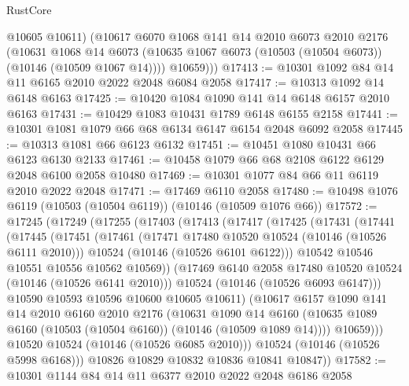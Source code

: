 \begin{lexlean}{RustCore}
\begin{coremodule}
          @10605
          @10611)
        (@10617
          @6070
          @1068
          @141
          @14
          @2010
          @6073
          @2010
          @2176
          (@10631
            @1068
            @14
            @6073
            (@10635 @1067 @6073 (@10503 (@10504 @6073)) (@10146 (@10509 @1067 @14))))
          @10659)))
@17413 := @10301 @1092 @84 @14 @11 @6165 @2010 @2022 @2048 @6084 @2058
@17417 := @10313 @1092 @14 @6148 @6163
@17425 := @10420 @1084 @1090 @141 @14 @6148 @6157 @2010 @6163
@17431 := @10429 @1083 @10431 @1789 @6148 @6155 @2158
@17441 := @10301 @1081 @1079 @66 @68 @6134 @6147 @6154 @2048 @6092 @2058
@17445 := @10313 @1081 @66 @6123 @6132
@17451 := @10451 @1080 @10431 @66 @6123 @6130 @2133
@17461 := @10458 @1079 @66 @68 @2108 @6122 @6129 @2048 @6100 @2058 @10480
@17469 := @10301 @1077 @84 @66 @11 @6119 @2010 @2022 @2048
@17471 := @17469 @6110 @2058
@17480 := @10498 @1076 @6119 (@10503 (@10504 @6119)) (@10146 (@10509 @1076 @66))
@17572 := @17245
    (@17249
      (@17255
        (@17403
          (@17413
            (@17417
              (@17425
                (@17431
                  (@17441
                    (@17445
                      (@17451
                        (@17461
                          (@17471 @17480 @10520 @10524 (@10146 (@10526 @6111 @2010)))
                          @10524
                          (@10146 (@10526 @6101 @6122)))
                        @10542
                        @10546
                        @10551
                        @10556
                        @10562
                        @10569))
                    (@17469 @6140 @2058 @17480 @10520 @10524 (@10146 (@10526 @6141 @2010)))
                    @10524
                    (@10146 (@10526 @6093 @6147)))
                  @10590
                  @10593
                  @10596
                  @10600
                  @10605
                  @10611)
                (@10617
                  @6157
                  @1090
                  @141
                  @14
                  @2010
                  @6160
                  @2010
                  @2176
                  (@10631
                    @1090
                    @14
                    @6160
                    (@10635 @1089 @6160 (@10503 (@10504 @6160)) (@10146 (@10509 @1089 @14))))
                  @10659)))
            @10520
            @10524
            (@10146 (@10526 @6085 @2010)))
          @10524
          (@10146 (@10526 @5998 @6168)))
        @10826
        @10829
        @10832
        @10836
        @10841
        @10847))
@17582 := @10301 @1144 @84 @14 @11 @6377 @2010 @2022 @2048 @6186 @2058

\end{coremodule}
\end{lexlean}
